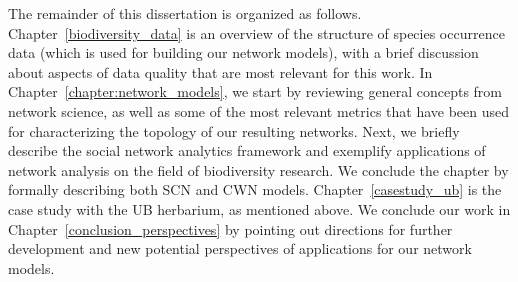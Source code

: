 The remainder of this dissertation is organized as follows.
Chapter~\ref{biodiversity_data} is an overview of the structure of species occurrence data (which is used for building our network models), with a brief discussion about aspects of data quality that are most relevant for this work. 
%
In Chapter~\ref{chapter:network_models}, we start by reviewing general concepts from network science, as well as some of the most relevant metrics that have been used for characterizing the topology of our resulting networks. 
Next, we briefly describe the social network analytics framework and exemplify applications of network analysis on the field of biodiversity research.
We conclude the chapter by formally describing both SCN and CWN models.
%
Chapter~\ref{casestudy_ub} is the case study with the UB herbarium, as mentioned above.
%
We conclude our work in Chapter~\ref{conclusion_perspectives} by pointing out directions for further development and new potential perspectives of applications for our network models.










